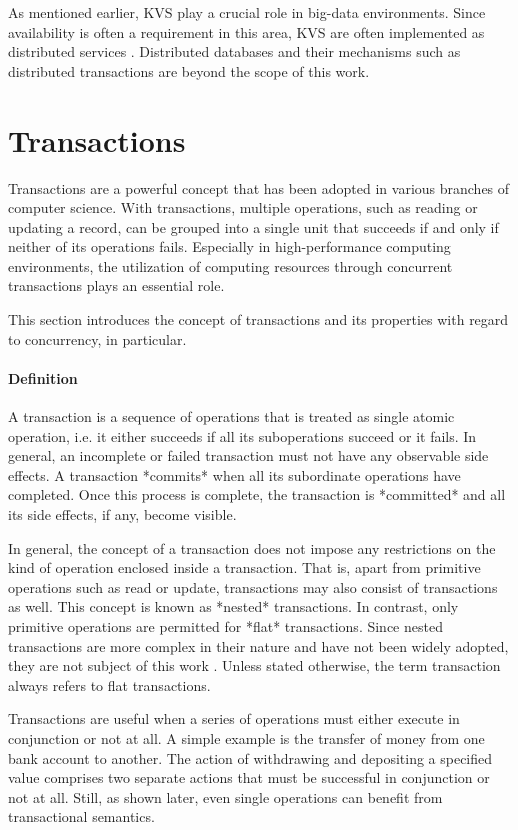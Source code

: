 As mentioned earlier, KVS play a crucial role in big-data environments. Since
availability is often a requirement in this area, KVS are often implemented as
distributed services \cite{decandia2007dynamo, lakshman2010cassandra,
wang2015hydradb}. Distributed databases and their mechanisms such as distributed
transactions are beyond the scope of this work.

\section{Transactions}

Transactions are a powerful concept that has been adopted in various branches of
computer science. With transactions, multiple operations, such as reading or
updating a record, can be grouped into a single unit that succeeds if and only
if neither of its operations fails. Especially in high-performance computing
environments, the utilization of computing resources through concurrent
transactions plays an essential role.

This section introduces the concept of transactions and its properties with
regard to concurrency, in particular.

\paragraph{Definition}

A transaction is a sequence of operations that is treated as single atomic
operation, i.e. it either succeeds if all its suboperations succeed or it fails.
In general, an incomplete or failed transaction must not have any observable
side effects. A transaction *commits* when all its subordinate operations have
completed. Once this process is complete, the transaction is *committed* and all
its side effects, if any, become visible.

In general, the concept of a transaction does not impose any restrictions on the
kind of operation enclosed inside a transaction. That is, apart from primitive
operations such as read or update, transactions may also consist of transactions
as well. This concept is known as *nested* transactions. In contrast, only
primitive operations are permitted for *flat* transactions. Since nested
transactions are more complex in their nature and have not been widely adopted,
they are not subject of this work \cite{?}. Unless stated otherwise, the term
transaction always refers to flat transactions.

Transactions are useful when a series of operations must either execute in
conjunction or not at all. A simple example is the transfer of money from one
bank account to another. The action of withdrawing and depositing a specified
value comprises two separate actions that must be successful in conjunction or
not at all. Still, as shown later, even single operations can benefit from
transactional semantics.

